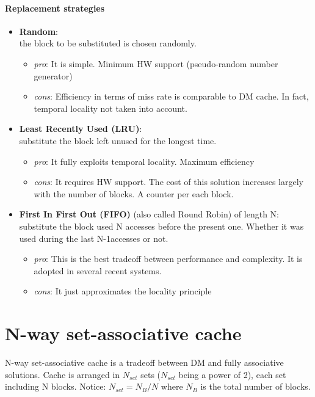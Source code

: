 \paragraph{Replacement strategies}
\begin{itemize}
    \item \textbf{Random}:\\
    the block to be substituted is chosen randomly.
    \begin{itemize}
        \item \textit{pro}: It is simple. Minimum HW support (pseudo-random number generator)
        \item \textit{cons}: Efficiency in terms of miss rate is comparable to DM cache. In fact, temporal locality not taken into account.
    \end{itemize}
    \item \textbf{Least Recently Used (LRU)}:\\
    substitute the block left unused for the longest time.
    \begin{itemize}
        \item \textit{pro}: It fully exploits temporal locality. Maximum efficiency
        \item \textit{cons}: It requires HW support. The cost of this solution increases largely with the number of blocks. A counter per each block.
    \end{itemize}
    \item \textbf{First In First Out (FIFO)} (also called Round Robin) of length N:\\
    substitute the block used N accesses before the present one. Whether it was used during the last N-1accesses or not.
    \begin{itemize}
        \item \textit{pro}: This is the best tradeoff between performance and complexity. It is adopted in several recent systems.
        \item \textit{cons}: It just approximates the locality principle
    \end{itemize}
\end{itemize}

\section{N-way set-associative cache}
N-way set-associative cache is a tradeoff between DM and fully associative solutions.
Cache is arranged in $N_{set}$ sets ($N_{set}$ being a power of 2), each set including N blocks. Notice:  $N_{set} = N_B/ N$   where $N_B$ is the total number of blocks.

